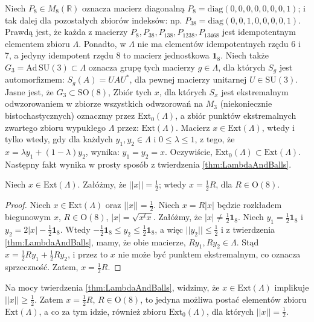 {Niech $P_{8} \in M_{8}(\mathbb{R})$ oznacza macierz diagonalną
$P_{8} = \text{diag}(0,0,0,0,0,0,0,1)$;
i tak dalej dla pozostałych zbiorów indeksów: np.
$P_{38} = \text{diag}(0,0,1,0,0,0,0,1)$.
Prawdą jest, że każda z macierzy
$P_{8}, P_{38}, P_{138}, P_{1238}, P_{13468}$ jest idempotentnym elementem
zbioru $\Lambda$.
Ponadto, w $\Lambda$ nie ma elementów idempotentnych rzędu 6 i 7,
a jedyny idempotent rzędu 8 to macierz jednostkowa $\mathbf{1}_{8}$.
Niech także $G_{3} = \text{Ad} \, \text{SU}(3) \subset \Lambda$ oznacza
grupę tych macierzy $g \in \Lambda$, dla których
$S_{g}$ jest automorfizmem: $S_{g}(A) = U A U^{*}$,
dla pewnej macierzy unitarnej $U \in \text{SU}(3)$.
Jasne jest, że $G_{3} \subset \text{SO}(8)$,
Zbiór tych $x$, dla których $S_{x}$ jest ekstremalnym
odwzorowaniem w zbiorze wszystkich odwzorowań na $M_{3}$
(niekoniecznie bistochastycznych) oznaczmy przez
$\text{Ext}_{0}(\Lambda)$,
a zbiór punktów ekstremalnych zwartego zbioru wypukłego
$\Lambda$ przez: $\text{Ext}(\Lambda)$.
Macierz $x \in \text{Ext}(\Lambda)$,
wtedy i tylko wtedy, gdy dla każdych
$y_{1}, y_{2} \in \Lambda$ i $0 \leq \lambda \leq 1$,
z tego, że $x = \lambda y_{1} + (1-\lambda) y_{2}$,
wynika: $y_{1} = y_{2} = x$.
Oczywiście, $\text{Ext}_{0}(\Lambda) \subset \text{Ext}(\Lambda)$.
Następny fakt wynika w prosty sposób z twierdzenia
\ref{thm:LambdaAndBalls}.

\begin{Theorem}
    \label{thm:oneHalfofOrthogonal}
    Niech $x \in \mathrm{Ext}(\Lambda)$.
Załóżmy, że $||x|| = \frac{1}{2}$;
wtedy $ x = \frac{1}{2} R$, dla $R \in \mathrm{O}(8)$.
\end{Theorem}
\begin{proof}
Niech $x \in \mathrm{Ext}(\Lambda)$ oraz $||x|| = \frac{1}{2}$.
Niech $x = R |x|$ będzie rozkładem biegunowym $x$,
    $R \in \text{O}(8)$, $|x| = \sqrt{x^{t} x}$.
Załóżmy, że $|x| \neq \frac{1}{2} \mathbf{1}_{8}$.
Niech $y_{1} = \frac{1}{2} \mathbf{1}_{8}$ i
    $y_{2} = 2 |x| - \frac{1}{2} \mathbf{1}_{8}$.
Wtedy $- \frac{1}{2} \mathbf{1}_{8} \leq y_{2} \leq \frac{1}{2} \mathbf{1}_{8}$,
a więc $|| y_{2} || \leq \frac{1}{2}$
i z twierdzenia \ref{thm:LambdaAndBalls},
mamy, że obie macierze, $R y_{1}, R y_{2} \in \Lambda$.
Stąd $x = \frac{1}{2} R y_{1} + \frac{1}{2} R y_{2}$,
i przez to $x$ nie może być punktem ekstremalnym, co oznacza sprzeczność.
Zatem, $x = \frac{1}{2} R$.
\end{proof}


Na mocy twierdzenia \ref{thm:LambdaAndBalls},
widzimy, że $x \in \text{Ext}(\Lambda)$ implikuje
    $||x|| \geq \frac{1}{2}$.
Zatem $x = \frac{1}{2} R$, $R \in \mathrm{O}(8)$,
to jedyna możliwa postać elementów zbioru $\text{Ext}(\Lambda)$,
a co za tym idzie, również zbioru $\text{Ext}_{0}(\Lambda)$,
dla których $||x|| = \frac{1}{2}$.

}
